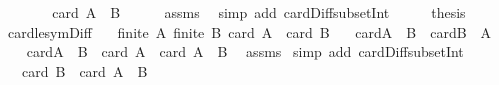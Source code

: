 \begin{isabellebody}
\ \ \isamarkupfalse%
\ \isamarkupfalse%
\ {\isachardoublequoteopen}{\isasymdots}\ {\isacharequal}{\kern0pt}\ card\ {\isacharparenleft}{\kern0pt}A\ {\isacharminus}{\kern0pt}\ B{\isacharparenright}{\kern0pt}{\isachardoublequoteclose}\isanewline
\ \ \ \ \isamarkupfalse%
\ assms\ \isamarkupfalse%
\ {\isacharparenleft}{\kern0pt}simp\ add{\isacharcolon}{\kern0pt}\ card{\isacharunderscore}{\kern0pt}Diff{\isacharunderscore}{\kern0pt}subset{\isacharunderscore}{\kern0pt}Int{\isacharparenright}{\kern0pt}\isanewline
\ \ \isamarkupfalse%
\ \isamarkupfalse%
\ {\isacharquery}{\kern0pt}thesis\ \isacommand{{\isachardot}{\kern0pt}}\isamarkupfalse%
\isanewline
{}\isamarkupfalse%
%
\endisatagproof
{\isafoldproof}%
%
\isadelimproof
\isanewline
%
\endisadelimproof
\isanewline
{}\isamarkupfalse%
\ card{\isacharunderscore}{\kern0pt}le{\isacharunderscore}{\kern0pt}sym{\isacharunderscore}{\kern0pt}Diff{\isacharcolon}{\kern0pt}\isanewline
\ \ \ {\isachardoublequoteopen}finite\ A{\isachardoublequoteclose}\ {\isachardoublequoteopen}finite\ B{\isachardoublequoteclose}\ {\isachardoublequoteopen}card\ A\ {\isasymle}\ card\ B{\isachardoublequoteclose}\isanewline
\ \ \ {\isachardoublequoteopen}card{\isacharparenleft}{\kern0pt}A\ {\isacharminus}{\kern0pt}\ B{\isacharparenright}{\kern0pt}\ {\isasymle}\ card{\isacharparenleft}{\kern0pt}B\ {\isacharminus}{\kern0pt}\ A{\isacharparenright}{\kern0pt}{\isachardoublequoteclose}\isanewline
%
\isadelimproof
%
\endisadelimproof
%
\isatagproof
{}\isamarkupfalse%
\ {\isacharminus}{\kern0pt}\isanewline
\ \ \isamarkupfalse%
\ {\isachardoublequoteopen}card{\isacharparenleft}{\kern0pt}A\ {\isacharminus}{\kern0pt}\ B{\isacharparenright}{\kern0pt}\ {\isacharequal}{\kern0pt}\ card\ A\ {\isacharminus}{\kern0pt}\ card\ {\isacharparenleft}{\kern0pt}A\ {\isasyminter}\ B{\isacharparenright}{\kern0pt}{\isachardoublequoteclose}\ \isamarkupfalse%
\ assms{\isacharparenleft}{\kern0pt}{}{\isacharcomma}{\kern0pt}{}{\isacharparenright}{\kern0pt}\ \isamarkupfalse%
{\isacharparenleft}{\kern0pt}simp\ add{\isacharcolon}{\kern0pt}\ card{\isacharunderscore}{\kern0pt}Diff{\isacharunderscore}{\kern0pt}subset{\isacharunderscore}{\kern0pt}Int{\isacharparenright}{\kern0pt}\isanewline
\ \ \isamarkupfalse%
\ \isamarkupfalse%
\ {\isachardoublequoteopen}{\isasymdots}\ {\isasymle}\ card\ B\ {\isacharminus}{\kern0pt}\ card\ {\isacharparenleft}{\kern0pt}A\ {\isasyminter}\ B{\isacharparenright}{\kern0pt}{\isachardoublequoteclose}\ \isamarkupfalse%

\end{isabellebody}
